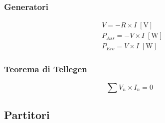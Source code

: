 \documentclass[10pt]{article}
\begin{document}
        \begin{minipage}[t]{.3\textwidth}
            \vspace{-\baselineskip}

            \subsubsection*{Generatori}
            
                \begin{minipage}[t]{.2\textwidth}
                    \vspace{-\baselineskip}

                    
                \end{minipage}
                \hfill
                \begin{minipage}[t]{.8\textwidth}
                    \vspace{-1.5\baselineskip}

                    \begin{align*}
                        &V = - R \times I \; [\mathrm{V}]\\
                        &P_{Ass} = - V \times I \; [\mathrm{W}]\\
                        &P_{Ero} = V \times I \; [\mathrm{W}]
                    \end{align*}
                \end{minipage}

        \end{minipage}
        \hfill
        \begin{minipage}[t]{.3\textwidth}
            \vspace{-\baselineskip}

            \subsubsection*{Teorema di Tellegen}

                \[
                    \sum V_n \times I_n = 0
                \]

        \end{minipage}

    \vspace{-\baselineskip}
    \subsection*{Partitori}
\end{document}
